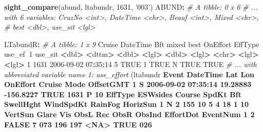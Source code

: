 \documentclass[
]{book}
\newenvironment{Shaded}{\begin{snugshade}}{\end{snugshade}}
\newcommand{\CommentTok}[1]{\textcolor[rgb]{0.56,0.35,0.01}{\textit{#1}}}
\newcommand{\DecValTok}[1]{\textcolor[rgb]{0.00,0.00,0.81}{#1}}
\newcommand{\ErrorTok}[1]{\textcolor[rgb]{0.64,0.00,0.00}{\textbf{#1}}}
\newcommand{\FloatTok}[1]{\textcolor[rgb]{0.00,0.00,0.81}{#1}}
\newcommand{\KeywordTok}[1]{\textcolor[rgb]{0.13,0.29,0.53}{\textbf{#1}}}
\newcommand{\NormalTok}[1]{#1}
\newcommand{\OperatorTok}[1]{\textcolor[rgb]{0.81,0.36,0.00}{\textbf{#1}}}
\newcommand{\OtherTok}[1]{\textcolor[rgb]{0.56,0.35,0.01}{#1}}
\newcommand{\StringTok}[1]{\textcolor[rgb]{0.31,0.60,0.02}{#1}}
\begin{document}
\begin{Shaded}
\begin{Highlighting}[]
\KeywordTok{sight_compare}\NormalTok{(abund, ltabundr, }\DecValTok{1631}\NormalTok{, }\StringTok{'003'}\NormalTok{)}
\NormalTok{ABUND}\OperatorTok{:}
\CommentTok{# A tibble: 0 x 6}
\CommentTok{# ... with 6 variables: CruzNo <int>, DateTime <chr>, Beauf <int>, Mixed <chr>,}
\CommentTok{#   best <dbl>, use_sit <lgl>}

\NormalTok{LTabundR}\OperatorTok{:}
\CommentTok{# A tibble: 1 x 9}
\StringTok{  }\NormalTok{Cruise DateTime              Bft mixed  best OnEffort EffType use_ef}\OperatorTok{~}\DecValTok{1}\NormalTok{ use_sit}
   \OperatorTok{<}\NormalTok{dbl}\OperatorTok{>}\StringTok{ }\ErrorTok{<}\NormalTok{dttm}\OperatorTok{>}\StringTok{              }\ErrorTok{<}\NormalTok{dbl}\OperatorTok{>}\StringTok{ }\ErrorTok{<}\NormalTok{lgl}\OperatorTok{>}\StringTok{ }\ErrorTok{<}\NormalTok{dbl}\OperatorTok{>}\StringTok{ }\ErrorTok{<}\NormalTok{lgl}\OperatorTok{>}\StringTok{    }\ErrorTok{<}\NormalTok{chr}\OperatorTok{>}\StringTok{   }\ErrorTok{<}\NormalTok{lgl}\OperatorTok{>}\StringTok{    }\ErrorTok{<}\NormalTok{lgl}\OperatorTok{>}\StringTok{  }
\DecValTok{1}   \DecValTok{1631} \DecValTok{2006-09-02} \DecValTok{07}\OperatorTok{:}\DecValTok{35}\OperatorTok{:}\DecValTok{14}     \DecValTok{5} \OtherTok{TRUE}      \DecValTok{1} \OtherTok{TRUE}\NormalTok{     N       }\OtherTok{TRUE}     \OtherTok{TRUE}   
\CommentTok{# ... with abbreviated variable name 1: use_effort}
\NormalTok{(ltabundr }\OperatorTok{%
\NormalTok{  Event            DateTime      Lat       Lon OnEffort Cruise Mode OffsetGMT}
\DecValTok{1}\NormalTok{     S }\DecValTok{2006-09-02} \DecValTok{07}\OperatorTok{:}\DecValTok{35}\OperatorTok{:}\DecValTok{14} \FloatTok{19.28883} \FloatTok{-156.8227}     \OtherTok{TRUE}   \DecValTok{1631}\NormalTok{    P        }\DecValTok{10}
\NormalTok{  EffType ESWsides Course SpdKt Bft SwellHght WindSpdKt RainFog HorizSun}
\DecValTok{1}\NormalTok{       N        }\DecValTok{2}    \DecValTok{155}    \DecValTok{10}   \DecValTok{5}         \DecValTok{4}        \DecValTok{18}       \DecValTok{1}       \DecValTok{10}
\NormalTok{  VertSun Glare Vis ObsL Rec ObsR ObsInd EffortDot EventNum}
\DecValTok{1}       \DecValTok{2} \OtherTok{FALSE}   \DecValTok{7}  \DecValTok{073} \DecValTok{196}  \DecValTok{197}   \OperatorTok{<}\OtherTok{NA}\OperatorTok{>}\StringTok{      }\OtherTok{TRUE}      \DecValTok{026}
}
\end{Highlighting}
\end{Shaded}
\end{document}

